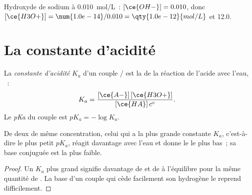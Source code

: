 \begin{example}\label{ex:g12:ka-and-pka:naoh}
Hydroxyde de sodium à \qty{0.010}{mol/L}~: $[\ce{OH-}] = 0.010$, donc
$[\ce{H3O+}] = \num{1.0e-14}/0.010 = \qty{1.0e-12}{mol/L}$ et  12.0.
\end{example}

\section{La constante d'acidité}

\begin{definition}\label{def:g12:ka-and-pka:ka}
La \emph{constante d'acidité} $K_a$ d'un
couple / est la  de la réaction de
l'acide avec l'eau, ~:
\[
  K_a = \frac{[\ce{A-}]\,[\ce{H3O+}]}{[\ce{HA}]\,c^\circ} .
\]
Le \emph{pKa} du couple est
$pK_a = -\log K_a$.
\end{definition}

\begin{proposition}\label{prop:g12:ka-and-pka:compare}
De deux  de même concentration, celui qui a la plus grande
constante
$K_a$, c'est-à-dire le plus petit $pK_a$, réagit davantage avec l'eau et
donne le  le plus bas~; sa base conjuguée est la plus faible.
\end{proposition}

\begin{proof}
Un $K_a$ plus grand signifie davantage de  et de  à
l'équilibre pour la même quantité de . La base  d'un
couple qui cède facilement son  hydrogène le reprend difficilement.
\end{proof}

